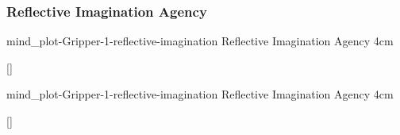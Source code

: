 {\newpage
  \noindent\begin{minipage}{\textwidth}
    \subsubsection{Reflective Imagination Agency}
    \experimentcausegroupplots{\dataappendixmaxtime}
                           {\dataappendixexperimentonemaxtime}
                           {\dataappendixexperimenttwomaxtime}
                           {\dataappendixexperimentthreemaxtime}
                           {\dataappendixexperimentonename}
                           {\dataappendixexperimenttwoname}
                           {\dataappendixexperimentthreename}
                           {\dataappendixexperimentoneprettyname}
                           {\dataappendixexperimenttwoprettyname}
                           \experimentcausegroupplotscontinued{\dataappendixexperimentthreeprettyname}
                                                              {mind_plot-Gripper-1-reflective-imagination}
                                                              {Reflective Imagination Agency}
                                                              {\experimentdatacommontablereference}
                                                              {4cm}
    \experimentdatablocksworldexample

    []{}
  \label{figure:mind_plot-Gripper-1-reflective-imagination}
  \end{minipage}

  \noindent\begin{minipage}{\textwidth}
    \experimentcausegroupplotstwo{\dataappendixmaxtime}
                           {\dataappendixexperimentonemaxtime}
                           {\dataappendixexperimenttwomaxtime}
                           {\dataappendixexperimentthreemaxtime}
                           {\dataappendixexperimentonename}
                           {\dataappendixexperimenttwoname}
                           {\dataappendixexperimentthreename}
                           {\dataappendixexperimentoneprettyname}
                           {\dataappendixexperimenttwoprettyname}
                           \experimentcausegroupplotstwocontinued{\dataappendixexperimentthreeprettyname}
                                                              {mind_plot-Gripper-1-reflective-imagination}
                                                              {Reflective Imagination Agency}
                                                              {\experimentdatacommontablereference}
                                                              {4cm}
    \experimentdatablocksworldexample

    []{}
  \label{figure:mind_plot-Gripper-1-reflective-imagination}
  \end{minipage}
}
